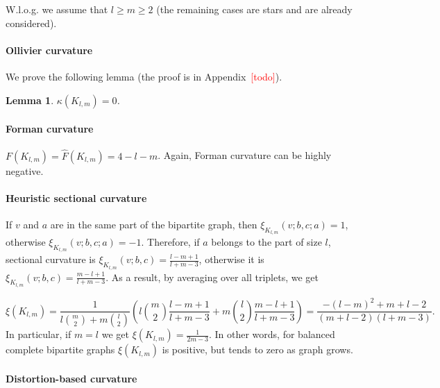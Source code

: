 \documentclass{article} %
\newtheorem{lemma}[theorem]{Lemma}
\begin{document}
W.l.o.g. we assume that $l \ge m \ge 2$ (the remaining cases are stars and are already considered).

\paragraph{Ollivier curvature}  
We prove the following lemma (the proof is in Appendix~\textcolor{red}{[todo]}).

\begin{lemma}\label{lem:bipartite_ollivier}
$\kappa(K_{l,m}) = 0$.
\end{lemma}

\paragraph{Forman curvature} 

$F(K_{l,m}) = \hat F(K_{l,m}) = 4 - l - m$. Again, Forman curvature can be highly negative.


\paragraph{Heuristic sectional curvature} If $v$ and $a$ are in the same part of the bipartite graph, then $\xi_{K_{l,m}}(v;b,c;a) = 1$, otherwise $\xi_{K_{l,m}}(v;b,c;a) = -1$. Therefore, if $a$ belongs to the part of size $l$, sectional curvature is
$\xi_{K_{l,m}}(v;b,c) = \frac{l-m+1}{l+m-3}$, otherwise it is $\xi_{K_{l,m}}(v;b,c) = \frac{m-l+1}{l+m-3}$. As a result, by averaging over all triplets, we get

\[
\xi({K_{l,m}}) = \frac{1}{l \binom{m}{2} + m \binom{l}{2}} \left(l \binom{m}{2} \frac{l-m+1}{l+m-3} + m \binom{l}{2} \frac{m-l+1}{l+m-3}\right) = \frac{-(l - m)^2 + m + l - 2}{(m+l-2)(l+m-3)}.
\]
In particular, if $m = l$ we get $\xi({K_{l,m}}) = \frac{1}{2m - 3}$. In other words, for balanced complete bipartite graphs $\xi({K_{l,m}})$ is positive, but tends to zero as graph grows.

\paragraph{Distortion-based curvature} 
\end{document}
